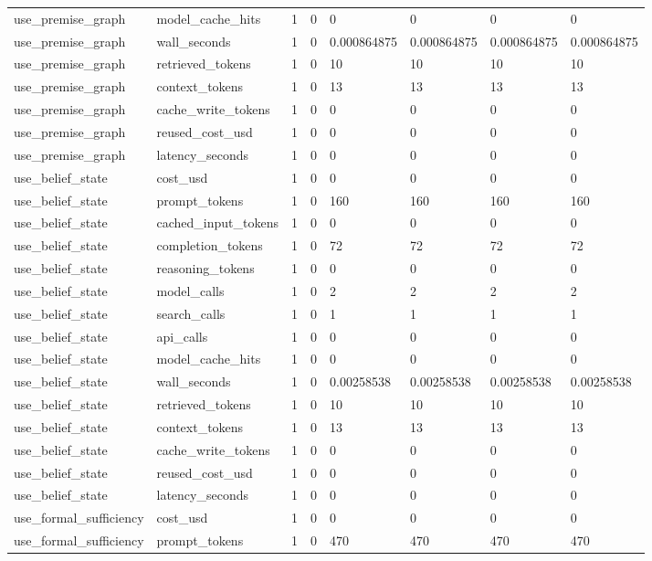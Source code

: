 \begin{tabular}{llllllll}
use\_premise\_graph & model\_cache\_hits & 1 & 0 & 0 & 0 & 0 & 0 \\
use\_premise\_graph & wall\_seconds & 1 & 0 & 0.000864875 & 0.000864875 & 0.000864875 & 0.000864875 \\
use\_premise\_graph & retrieved\_tokens & 1 & 0 & 10 & 10 & 10 & 10 \\
use\_premise\_graph & context\_tokens & 1 & 0 & 13 & 13 & 13 & 13 \\
use\_premise\_graph & cache\_write\_tokens & 1 & 0 & 0 & 0 & 0 & 0 \\
use\_premise\_graph & reused\_cost\_usd & 1 & 0 & 0 & 0 & 0 & 0 \\
use\_premise\_graph & latency\_seconds & 1 & 0 & 0 & 0 & 0 & 0 \\
use\_belief\_state & cost\_usd & 1 & 0 & 0 & 0 & 0 & 0 \\
use\_belief\_state & prompt\_tokens & 1 & 0 & 160 & 160 & 160 & 160 \\
use\_belief\_state & cached\_input\_tokens & 1 & 0 & 0 & 0 & 0 & 0 \\
use\_belief\_state & completion\_tokens & 1 & 0 & 72 & 72 & 72 & 72 \\
use\_belief\_state & reasoning\_tokens & 1 & 0 & 0 & 0 & 0 & 0 \\
use\_belief\_state & model\_calls & 1 & 0 & 2 & 2 & 2 & 2 \\
use\_belief\_state & search\_calls & 1 & 0 & 1 & 1 & 1 & 1 \\
use\_belief\_state & api\_calls & 1 & 0 & 0 & 0 & 0 & 0 \\
use\_belief\_state & model\_cache\_hits & 1 & 0 & 0 & 0 & 0 & 0 \\
use\_belief\_state & wall\_seconds & 1 & 0 & 0.00258538 & 0.00258538 & 0.00258538 & 0.00258538 \\
use\_belief\_state & retrieved\_tokens & 1 & 0 & 10 & 10 & 10 & 10 \\
use\_belief\_state & context\_tokens & 1 & 0 & 13 & 13 & 13 & 13 \\
use\_belief\_state & cache\_write\_tokens & 1 & 0 & 0 & 0 & 0 & 0 \\
use\_belief\_state & reused\_cost\_usd & 1 & 0 & 0 & 0 & 0 & 0 \\
use\_belief\_state & latency\_seconds & 1 & 0 & 0 & 0 & 0 & 0 \\
use\_formal\_sufficiency & cost\_usd & 1 & 0 & 0 & 0 & 0 & 0 \\
use\_formal\_sufficiency & prompt\_tokens & 1 & 0 & 470 & 470 & 470 & 470 \\

\end{tabular}
